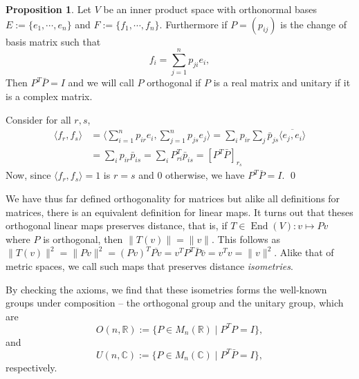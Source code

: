 \documentclass[
]{article}
\theoremstyle{definition}
\newtheorem{prop}{Proposition}[section]
\theoremstyle{definition}
\begin{document}
\begin{prop}
  Let \(V\) be an inner product space with orthonormal bases 
  \(E := \{e_1, \cdots, e_n\}\) and \(F := \{f_1, \cdots, f_n\}\). Furthermore 
  if \(P = (p_{ij})\) is the change of basis matrix such that 
  \[f_i = \sum_{j = 1}^n p_{ji}e_i,\]
  Then \(P^T \bar{P} = I\) and we will call \(P\) orthogonal if \(P\) is a real 
  matrix and unitary if it is a complex matrix.
\end{prop}
\proof

Consider for all \(r, s\), \begin{align*}
    \langle f_r, f_s \rangle & = \langle \sum_{i = 1}^n p_{ir}e_i, 
      \sum_{j = 1}^n p_{js}e_j \rangle
      = \sum_i p_{ir} \sum_j \bar{p}_{js} \overline{\langle e_j, e_i \rangle}\\
    & = \sum_i p_{ir} \bar{p}_{is} = \sum_i P^T_{ri} \bar{p}_{is} = [P^T \bar{P}]_{r_s}
  \end{align*} Now, since \(\langle f_r, f_s \rangle = 1\) is \(r = s\)
and 0 otherwise, we have \(P^T \bar{P} = I\). \qed

We have thus far defined orthogonality for matrices but alike all
definitions for matrices, there is an equivalent definition for linear
maps. It turns out that theses orthogonal linear maps preserves
distance, that is, if \(T \in \mathop{\mathrm{End}}(V) : v \mapsto Pv\)
where \(P\) is orthogonal, then \(\| T(v) \| = \| v \|\). This follows
as
\(\|T(v)\|^2 = \|Pv\|^2 = (Pv)^T \overline{Pv} = v^T P^T \bar{P} \bar{v} = v^T v = \| v \|^2\).
Alike that of metric spaces, we call such maps that preserves distance
\emph{isometries}.

By checking the axioms, we find that these isometries forms the
well-known groups under composition -- the orthogonal group and the
unitary group, which are
\[O(n, \mathbb{R}) := \{P \in M_n(\mathbb{R}) \mid P^T P = I\},\] and
\[U(n, \mathbb{C}) := \{P \in M_n(\mathbb{C}) \mid P^T \bar{P} = I\},\]
respectively.
\end{document}
